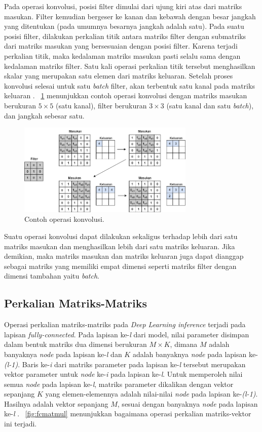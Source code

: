 Pada operasi konvolusi, posisi filter dimulai dari ujung kiri atas dari matriks masukan. Filter kemudian bergeser ke kanan dan kebawah dengan besar jangkah yang ditentukan (pada umumnya besarnya jangkah adalah satu). Pada suatu posisi filter, dilakukan perkalian titik antara matriks filter dengan submatriks dari matriks masukan yang bersesuaian dengan posisi filter. Karena terjadi perkalian titik, maka kedalaman matriks masukan pasti selalu sama dengan kedalaman matriks filter. Satu kali operasi perkalian titik tersebut menghasilkan skalar yang merupakan satu elemen dari matriks keluaran. Setelah proses konvolusi selesai untuk satu \textit{batch} filter, akan terbentuk satu kanal pada matriks keluaran \cite{deeplearningmatrix}. \pic~\ref{fig:conv} menunjukkan contoh operasi konvolusi dengan matriks masukan berukuran $5 \times 5$ (satu kanal), filter berukuran $3 \times 3$ (satu kanal dan satu \textit{batch}), dan jangkah sebesar satu.

\begin{figure}
	\centering
	\includegraphics[width=0.75\textwidth]
	{pics/conv.png}
	\caption{Contoh operasi konvolusi.}
	\label{fig:conv}
\end{figure}

Suatu operasi konvolusi dapat dilakukan sekaligus terhadap lebih dari satu matriks masukan dan menghasilkan lebih dari satu matriks keluaran. Jika demikian, maka matriks masukan dan matriks keluaran juga dapat dianggap sebagai matriks yang memiliki empat dimensi seperti matriks filter dengan dimensi tambahan yaitu \textit{batch}.

\subsection{Perkalian Matriks-Matriks}
Operasi perkalian matriks-matriks pada \textit{Deep Learning inference} terjadi pada lapisan \textit{fully-connected}. Pada lapisan ke-\textit{l} dari model, nilai parameter disimpan dalam bentuk matriks dua dimensi berukuran $M \times K$, dimana $M$ adalah banyaknya \textit{node} pada lapisan ke-\textit{l} dan $K$ adalah banyaknya \textit{node} pada lapisan ke-\textit{(l-1)}. Baris ke-\textit{i} dari matriks parameter pada lapisan ke-\textit{l} tersebut merupakan vektor parameter untuk \textit{node} ke-\textit{i} pada lapisan ke-\textit{l}. Untuk memperoleh nilai semua \textit{node} pada lapisan ke-\textit{l}, matriks parameter dikalikan dengan vektor sepanjang $K$ yang elemen-elemennya adalah nilai-nilai \textit{node} pada lapisan ke-\textit{(l-1)}. Hasilnya adalah vektor sepanjang $M$, sesuai dengan banyaknya \textit{node} pada lapisan ke-\textit{l} \cite{deeplearningmatrix}. \pic~\ref{fig:fcmatmul} menunjukkan bagaimana operasi perkalian matriks-vektor ini terjadi. 


